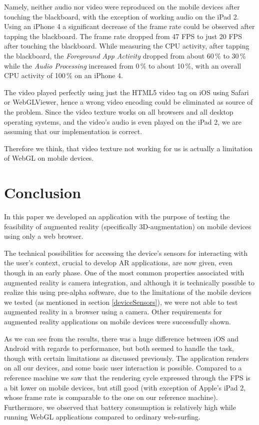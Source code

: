 \documentclass[12pt,journal,compsoc]{IEEEtran}
\begin{document}
Namely, neither audio nor video were reproduced on the mobile devices after touching the blackboard, with the exception of working audio on the iPad 2. Using an iPhone 4 a significant decrease of the frame rate could be observed after tapping the blackboard. The frame rate dropped from 47 FPS to just 20 FPS after touching the blackboard. While measuring the CPU activity, after tapping the blackboard, the \textit{Foreground App Activity} dropped from about 60\,\% to 30\,\% while the \textit{Audio Processing} increased from 0\,\% to about 10\,\%, with an overall CPU activity of 100\,\% on an iPhone 4.

The video played perfectly using just the HTML5 video tag on iOS using Safari or WebGLViewer, hence a wrong video encoding could be eliminated as source of the problem. Since the video texture works on all browsers and all desktop operating systems, and the video’s audio is even played on the iPad 2, we are assuming that our implementation is correct. 

Therefore we think, that video texture not working for us is actually a limitation of WebGL on mobile devices.


\section{Conclusion}
In this paper we developed an application with the purpose of testing the feasibility of augmented reality (specifically 3D-augmentation) on mobile devices using only a web browser. 

The technical possibilities for accessing the device’s sensors for interacting with the user’s context, crucial to develop AR applications, are now given, even though in an early phase. One of the most common properties associated with augmented reality is camera integration, and although it is technically possible to realize this using pre-alpha software, due to the limitations of the mobile devices we tested (as mentioned in section \ref{deviceSensors}), we were not able to test augmented reality in a browser using a camera. Other requirements for augmented reality applications on mobile devices were successfully shown.

As we can see from the results, there was a huge difference between iOS and Android with regards to performance, but both seemed to handle the task, though with certain limitations as discussed previously. The application renders on all our devices, and some basic user interaction is possible. Compared to a reference machine we saw that the rendering cycle expressed through the FPS is a bit lower on mobile devices, but still good (with exception of Apple’s iPad 2, whose frame rate is comparable to the one on our reference machine). Furthermore, we observed that battery consumption is relatively high while running WebGL applications compared to ordinary web-surfing. 
\end{document}

